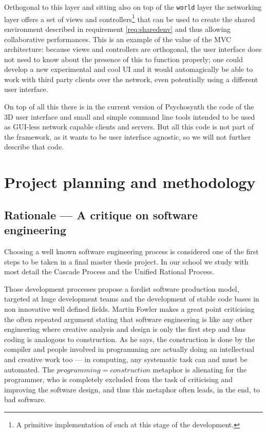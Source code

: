 Orthogonal to this layer and sitting also on top of the \texttt{world}
layer the networking layer offers a set of views and
controllers\footnote{A primitive implementation of such at this stage
  of the development.}  that can be used to create the shared
environment described in requirement \ref{req:sharedenv} and thus
allowing collaborative performances. This is an example of the value
of the MVC architecture: because views and controllers are orthogonal,
the user interface does not need to know about the presence of this to
function properly; one could develop a new experimental and cool UI
and it would automagically be able to work with third party clients
over the network, even potentially using a different user interface.

On top of all this there is in the current version of Psychosynth the
code of the 3D user interface and small and simple command line tools
intended to be used as GUI-less network capable clients and
servers. But all this code is not part of the framework, as it wants
to be user interface agnostic, so we will not further describe that
code.

\section{Project planning and methodology}

\subsection{Rationale --- A critique on software engineering}

Choosing a well known software engineering process is considered one
of the first steps to be taken in a final master thesis project. In
our school we study with most detail the Cascade Process and the
Unified Rational Process.

Those development processes propose a fordist software production
model, targeted at huge development teams and the development of
stable code bases in non innovative well defined fields. Martin Fowler
makes a great point \cite{fowler01design} criticising the often
repeated argument stating that software engineering is like any other
engineering where creative analysis and design is only the first step
and thus coding is analogous to construction. As he says, the
construction is done by the compiler and people involved in
programming are actually doing an intellectual and creative work too
--- in computing, any systematic task can and must be automated. The
$programming=construction$ metaphor is alienating for the programmer,
who is completely excluded from the task of criticising and improving
the software design, and thus this metaphor often leads, in the end,
to bad software.

